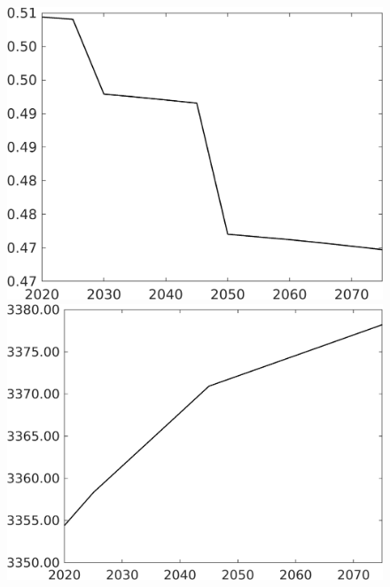 \begin{figure}[h!!]
\begin{minipage}[]{0.32\textwidth}
	\end{minipage}
	\begin{minipage}[]{0.32\textwidth}
		\includegraphics[width=1\textwidth]{../../codding_model/own_basedOnFried/optimalPol_elastS_DisuSci/figures/all_1705/Single_OPT_T_NoTaus_hh_spillover0_sep1_BN0_ineq0_etaa0.79.png}
	\end{minipage}
	\begin{minipage}[]{0.32\textwidth}
		\includegraphics[width=1\textwidth]{../../codding_model/own_basedOnFried/optimalPol_elastS_DisuSci/figures/all_1705/Single_OPT_T_NoTaus_Af_spillover0_sep1_BN0_ineq0_etaa0.79.png}

\end{minipage}
\end{figure}
